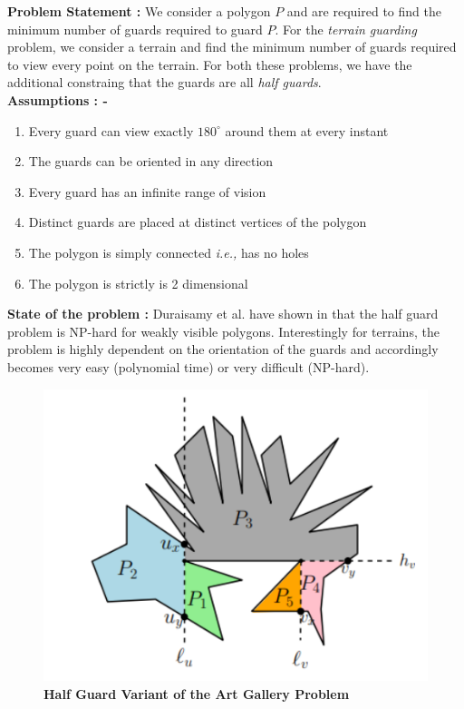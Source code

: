 \documentclass{article}
\begin{document}
\noindent \textbf{Problem Statement :} We consider a polygon $P$ and are required to find the minimum number of guards required to guard $P$. For the \textit{terrain guarding} problem, we consider a terrain and find the minimum number of guards required to view every point on the terrain. For both these problems, we have the additional constraing that the guards are all \textit{half guards}. \\ 

\noindent \textbf{Assumptions : -}

\begin{enumerate}

	\item Every guard can view exactly $180 ^ \circ$ around them at every instant
	
	\item The guards can be oriented in any direction
	
	\item Every guard has an infinite range of vision
	
	 \item Distinct guards are placed at distinct vertices of the polygon
	
	\item The polygon is simply connected \textit{i.e.,} has no holes
	
	\item The polygon is strictly is 2 dimensional
	
\end{enumerate}

\noindent \textbf{State of the problem :} Duraisamy et al. have shown in \cite{duraisamy2022half} that the half guard problem is NP-hard for weakly visible polygons. Interestingly for terrains, the problem is highly dependent on the orientation of the guards and accordingly becomes very easy (polynomial time) or very difficult (NP-hard).

\begin{figure}[H]
  \includegraphics[scale=0.5]{Half.png}
  \centering
  \caption{\textbf{Half Guard Variant of the Art Gallery Problem}}
  \label{img:half}
\end{figure}
\end{document}
